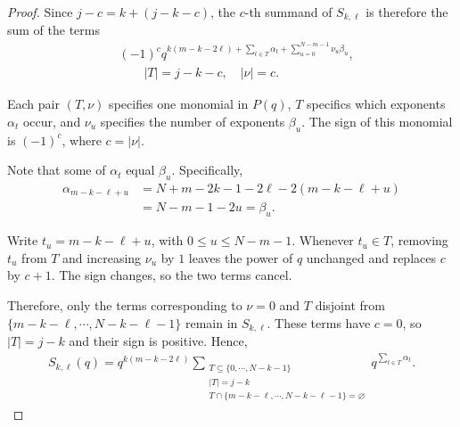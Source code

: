 \documentclass[12pt]{amsart}
\theoremstyle{definition}
\theoremstyle{remark}
\numberwithin{equation}{section}
\numberwithin{figure}{section}
\begin{document}
\begin{proof}
Since $j-c = k+(j-k-c)$, the $c$-th summand of $S_{k,\ell}$ is therefore the sum of the terms
\begin{align*}
    &(-1)^c q^{k(m-k-2\ell)+\sum_{t \in T}\alpha_t+\sum_{u = 0}^{N-m-1}\nu_u\beta_u}, \\
    &\qquad |T| = j-k-c, \quad |\nu| = c.
\end{align*}

Each pair $(T,\nu)$ specifies one monomial in $P(q)$, $T$ specifics which exponents $\alpha_t$ occur, and $\nu_u$ specifies the number of exponents $\beta_u$. The sign of this monomial is $(-1)^c$, where $c = |\nu|$.

Note that some of $\alpha_t$ equal $\beta_u$. Specifically,
\begin{align*}
    \alpha_{m-k-\ell+u}
    &= N+m-2k-1-2\ell-2(m-k-\ell+u) \\
    &= N-m-1-2u = \beta_u.
\end{align*}

Write $t_u = m-k-\ell+u$, with $0 \leq u \leq N-m-1$. Whenever $t_u \in T$, removing $t_u$ from $T$ and increasing $\nu_u$ by $1$ leaves the power of $q$ unchanged and replaces $c$ by $c+1$. The sign changes, so the two terms cancel. 


Therefore, only the terms corresponding to $\nu = 0$ and $T$ disjoint from $\{m-k-\ell,\cdots,N-k-\ell-1\}$ remain in $S_{k,\ell}$. These terms have $c = 0$, so $|T| = j-k$ and their sign is positive. Hence,
\begin{align}\label{eq:two-m direct-cancellation}
    S_{k,\ell}(q) = q^{k(m-k-2\ell)}
    \sum_{\substack{T \subseteq \{0,\cdots,N-k-1\}\\|T| = j-k\\
        T \cap \{m-k-\ell,\cdots,N-k-\ell-1\} = \varnothing}}
    q^{\sum_{t \in T}\alpha_t}.
\end{align}


\end{proof}
\end{document}
